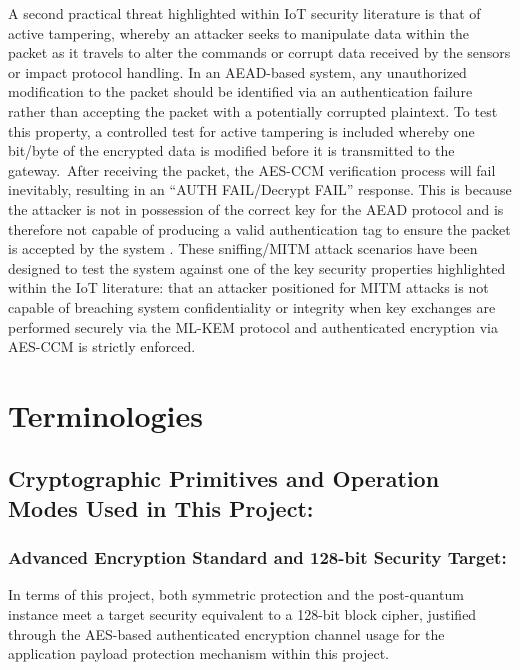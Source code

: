 \documentclass[a4paper]{scrartcl}
\begin{document}
    A second practical threat highlighted within IoT security literature is that of active tampering, whereby an attacker seeks to manipulate data within the packet as it travels to alter the commands or corrupt data received by the sensors or impact protocol handling. In an AEAD-based system, any unauthorized modification to the packet should be identified via an authentication failure rather than accepting the packet with a potentially corrupted plaintext.\cite{RFC5116} To test this property, a controlled test for active tampering is included whereby one bit/byte of the encrypted data is modified before it is transmitted to the gateway. After receiving the packet, the AES-CCM verification process will fail inevitably, resulting in an “AUTH FAIL/Decrypt FAIL” response.\cite{RFC3610} This is because the attacker is not in possession of the correct key for the AEAD protocol and is therefore not capable of producing a valid authentication tag to ensure the packet is accepted by the system \cite{RFC5116}\cite{RFC3610}. These sniffing/MITM attack scenarios have been designed to test the system against one of the key security properties highlighted within the IoT literature: that an attacker positioned for MITM attacks is not capable of breaching system confidentiality or integrity when key exchanges are performed securely via the ML-KEM protocol and authenticated encryption via AES-CCM is strictly enforced. \cite{NISTFIPS203}\cite{RFC3610}\cite{nasser2022}

    \section{Terminologies}
     \subsection{Cryptographic Primitives and Operation Modes Used in This Project:}
    
     \subsubsection{Advanced Encryption Standard and 128-bit Security Target:}

    In terms of this project, both symmetric protection and the post-quantum instance meet a target security equivalent to a 128-bit block cipher, justified through the AES-based authenticated encryption channel usage for the application payload protection mechanism within this project.
\end{document}
